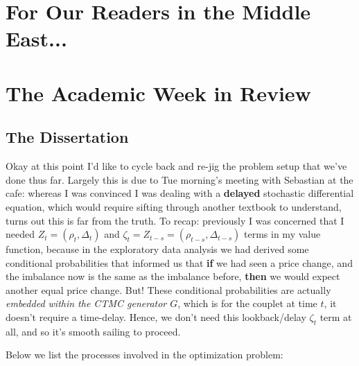 \documentclass[12pt]{article}
\begin{document}
\newpage

\section*{For Our Readers in the Middle East...}
 

\section*{The Academic Week in Review}

\subsection*{The Dissertation}
Okay at this point I'd like to cycle back and re-jig the problem setup that we've done thus far. Largely this is due to Tue morning's meeting with Sebastian at the cafe: whereas I was convinced I was dealing with a \textbf{delayed} stochastic differential equation, which would require sifting through another textbook to understand, turns out this is far from the truth. To recap: previously I was concerned that I needed $Z_t = (\rho_t, \Delta_t) $ and $\zeta_t = Z_{t-s} = (\rho_{t-s}, \Delta_{t-s}) $ terms in my value function, because in the exploratory data analysis we had derived some conditional probabilities that informed us that \textbf{if} we had seen a price change, and the imbalance now is the same as the imbalance before, \textbf{then} we would expect another equal price change. But! These conditional probabilities are actually \textit{embedded within the CTMC generator $G$}, which is for the couplet at time $t$, it doesn't require a time-delay. Hence, we don't need this lookback/delay $\zeta_t$ term at all, and so it's smooth sailing to proceed.

Below we list the processes involved in the optimization problem:
\end{document}
